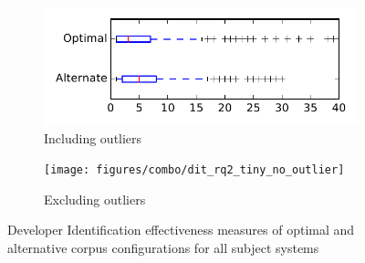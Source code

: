 
\begin{figure}
    \centering
    \begin{subfigure}{.4\textwidth}
        \centering
        \includegraphics[height=0.4\textheight]{figures/combo/dit_rq2_tiny}
        \caption{Including outliers}\label{fig:combo:dit:rq2:tiny_outlier}
    \end{subfigure}%
    \begin{subfigure}{.4\textwidth}
        \centering
        \texttt{[image: figures/combo/dit\_rq2\_tiny\_no\_outlier]}
        \caption{Excluding outliers}\label{fig:combo:dit:rq2:tiny_no_outlier}
    \end{subfigure}
\caption{Developer Identification effectiveness measures of optimal and alternative corpus configurations for all subject systems}
\label{fig:combo:dit:rq2:tiny}
\end{figure}
